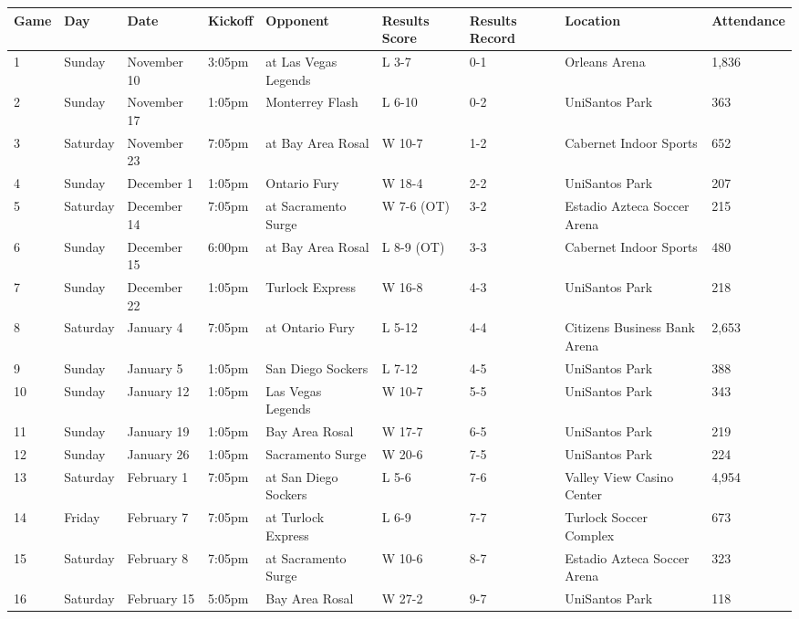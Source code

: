 \documentclass{article}
\begin{document}
\begin{tabular}{lllllllll}
\toprule
Game & Day & Date & Kickoff & Opponent & Results Score & Results Record & Location & Attendance \\
\midrule
1 & Sunday & November 10 & 3:05pm & at Las Vegas Legends & L 3-7 & 0-1 & Orleans Arena & 1,836 \\
2 & Sunday & November 17 & 1:05pm & Monterrey Flash & L 6-10 & 0-2 & UniSantos Park & 363 \\
3 & Saturday & November 23 & 7:05pm & at Bay Area Rosal & W 10-7 & 1-2 & Cabernet Indoor Sports & 652 \\
4 & Sunday & December 1 & 1:05pm & Ontario Fury & W 18-4 & 2-2 & UniSantos Park & 207 \\
5 & Saturday & December 14 & 7:05pm & at Sacramento Surge & W 7-6 (OT) & 3-2 & Estadio Azteca Soccer Arena & 215 \\
6 & Sunday & December 15 & 6:00pm & at Bay Area Rosal & L 8-9 (OT) & 3-3 & Cabernet Indoor Sports & 480 \\
7 & Sunday & December 22 & 1:05pm & Turlock Express & W 16-8 & 4-3 & UniSantos Park & 218 \\
8 & Saturday & January 4 & 7:05pm & at Ontario Fury & L 5-12 & 4-4 & Citizens Business Bank Arena & 2,653 \\
9 & Sunday & January 5 & 1:05pm & San Diego Sockers & L 7-12 & 4-5 & UniSantos Park & 388 \\
10 & Sunday & January 12 & 1:05pm & Las Vegas Legends & W 10-7 & 5-5 & UniSantos Park & 343 \\
11 & Sunday & January 19 & 1:05pm & Bay Area Rosal & W 17-7 & 6-5 & UniSantos Park & 219 \\
12 & Sunday & January 26 & 1:05pm & Sacramento Surge & W 20-6 & 7-5 & UniSantos Park & 224 \\
13 & Saturday & February 1 & 7:05pm & at San Diego Sockers & L 5-6 & 7-6 & Valley View Casino Center & 4,954 \\
14 & Friday & February 7 & 7:05pm & at Turlock Express & L 6-9 & 7-7 & Turlock Soccer Complex & 673 \\
15 & Saturday & February 8 & 7:05pm & at Sacramento Surge & W 10-6 & 8-7 & Estadio Azteca Soccer Arena & 323 \\
16 & Saturday & February 15 & 5:05pm & Bay Area Rosal & W 27-2 & 9-7 & UniSantos Park & 118 \\
\bottomrule
\end{tabular}
\end{document}

